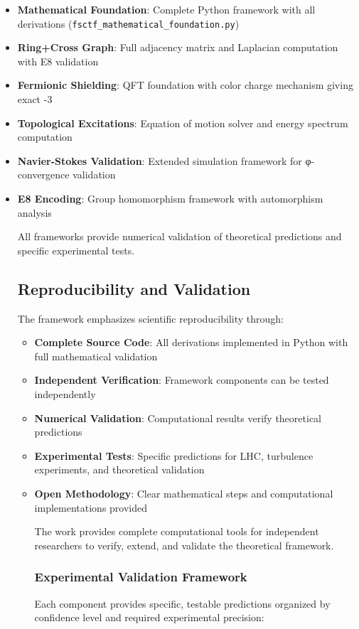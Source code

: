 \documentclass[12pt,a4paper]{article}
\begin{document}
\begin{itemize}
\item \textbf{Mathematical Foundation}: Complete Python framework with all derivations (\texttt{fsctf\_mathematical\_foundation.py})
\item \textbf{Ring+Cross Graph}: Full adjacency matrix and Laplacian computation with E8 validation
\item \textbf{Fermionic Shielding}: QFT foundation with color charge mechanism giving exact -3
\item \textbf{Topological Excitations}: Equation of motion solver and energy spectrum computation
\item \textbf{Navier-Stokes Validation}: Extended simulation framework for φ-convergence validation
\item \textbf{E8 Encoding}: Group homomorphism framework with automorphism analysis

All frameworks provide numerical validation of theoretical predictions and specific experimental tests.

\subsection{Reproducibility and Validation}

The framework emphasizes scientific reproducibility through:

\begin{itemize}
\item \textbf{Complete Source Code}: All derivations implemented in Python with full mathematical validation
\item \textbf{Independent Verification}: Framework components can be tested independently
\item \textbf{Numerical Validation}: Computational results verify theoretical predictions
\item \textbf{Experimental Tests}: Specific predictions for LHC, turbulence experiments, and theoretical validation
\item \textbf{Open Methodology}: Clear mathematical steps and computational implementations provided

The work provides complete computational tools for independent researchers to verify, extend, and validate the theoretical framework.

\subsubsection{Experimental Validation Framework}
Each component provides specific, testable predictions organized by confidence level and required experimental precision:


\end{itemize}
\end{itemize}
\end{document}

